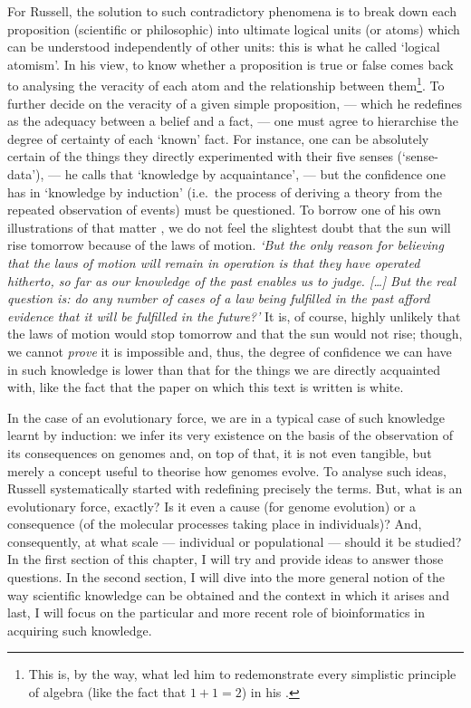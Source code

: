 For Russell, the solution to such contradictory phenomena is to break down each proposition (scientific or philosophic) into ultimate logical units (or atoms) which can be understood independently of other units: this is what he called ‘logical atomism’.
In his view, to know whether a proposition is true or false comes back to analysing the veracity of each atom and the relationship between them\footnote{This is, by the way, what led him to redemonstrate every simplistic principle of algebra (like the fact that $1+1=2$) in his \textit{} \citeyearpar{whitehead1912principia}.}.
To further decide on the veracity of a given simple proposition, — which he redefines as the adequacy between a belief and a fact, — 
one must agree to hierarchise the degree of certainty of each ‘known’ fact.
For instance, one can be absolutely certain of the things they directly experimented with their five senses (‘sense-data’), — he calls that ‘knowledge by acquaintance’, — but the confidence one has in ‘knowledge by induction’ (i.e.\ the process of deriving a theory from the repeated observation of events) must be questioned.
To borrow one of his own illustrations of that matter \citep{russell1912problems}, we do not feel the slightest doubt that the sun will rise tomorrow because of the laws of motion.
\textit{‘But the \textit{only} reason for believing that the laws of motion will remain in operation is that they have operated hitherto, so far as our knowledge of the past enables us to judge. […] But the real question is: do any number of cases of a law being fulfilled in the past afford evidence that it will be fulfilled in the future?’}
It is, of course, highly unlikely that the laws of motion would stop tomorrow and that the sun would not rise; though, we cannot \textit{prove} it is impossible and, thus, the degree of confidence we can have in such knowledge is lower than that for the things we are directly acquainted with, like the fact that the paper on which this text is written is white.


In the case of an evolutionary force, we are in a typical case of such knowledge learnt by induction: 
we infer its very existence on the basis of the observation of its consequences on genomes and, on top of that, it is not even tangible, but merely a concept useful to theorise how genomes evolve.
To analyse such ideas, Russell systematically started with redefining precisely the terms.
But, what is an evolutionary force, exactly? Is it even a cause (for genome evolution) or a consequence (of the molecular processes taking place in individuals)? And, consequently, at what scale — individual or populational — should it be studied?
In the first section of this chapter, I will try and provide ideas to answer those questions.
In the second section, I will dive into the more general notion of the way scientific knowledge can be obtained and the context in which it arises and last, I will focus on the particular and more recent role of bioinformatics in acquiring such knowledge.





